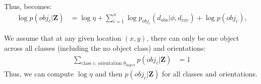 Thus,  becomes:
%
\begin{align}
  \log p( obj_c | \mathbf{Z} ) &=
   \log{\eta} + \sum_{i=1}^{n} { \log p_{obj_c}( d_{\text{obs}} | \phi, d_{\text{ray}}) }
   + \log p(obj_c)
   \text{,}
   \label{eq:obj_model_pos}
\end{align}

We assume that at any given location $(x, y)$, there can only be one object
across all classes (including the no object class) and orientations:
%
\begin{align}
  \sum_{ \text{class $c$, orientation $\theta_{\text{object}}$} }
  p(obj_c | \mathbf{Z})
  &= 1
\end{align}
%
Thus, we can compute $\log \eta$ and then $p(obj_c | \mathbf{Z})$ for all
classes and orientations.

